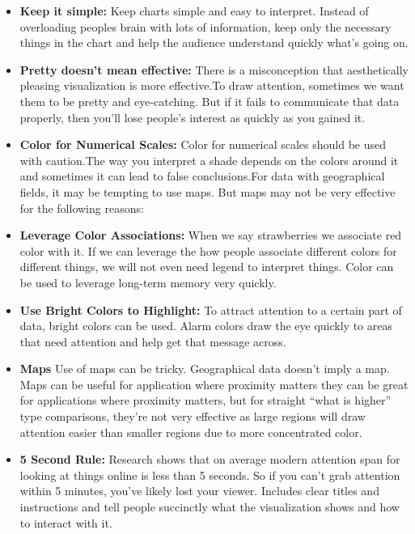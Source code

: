 \documentclass[]{book}
\providecommand{\tightlist}{%
  \setlength{\itemsep}{0pt}\setlength{\parskip}{0pt}}
\theoremstyle{definition}
\theoremstyle{definition}
\theoremstyle{definition}
\theoremstyle{remark}
\begin{document}
\begin{itemize}
\tightlist
\item
  \textbf{Keep it simple:} Keep charts simple and easy to interpret.
  Instead of overloading peoples brain with lots of information, keep
  only the necessary things in the chart and help the audience
  understand quickly what's going on.
\item
  \textbf{Pretty doesn't mean effective:} There is a misconception that
  aesthetically pleasing visualization is more effective.To draw
  attention, sometimes we want them to be pretty and eye-catching. But
  if it fails to communicate that data properly, then you'll lose
  people's interest as quickly as you gained it.
\item
  \textbf{Color for Numerical Scales:} Color for numerical scales should
  be used with caution.The way you interpret a shade depends on the
  colors around it and sometimes it can lead to false conclusions.For
  data with geographical fields, it may be tempting to use maps. But
  maps may not be very effective for the following reasons:
\item
  \textbf{Leverage Color Associations:} When we say strawberries we
  associate red color with it. If we can leverage the how people
  associate different colors for different things, we will not even need
  legend to interpret things. Color can be used to leverage long-term
  memory very quickly.
\item
  \textbf{Use Bright Colors to Highlight:} To attract attention to a
  certain part of data, bright colors can be used. Alarm colors draw the
  eye quickly to areas that need attention and help get that message
  across.
\item
  \textbf{Maps} Use of maps can be tricky. Geographical data doesn't
  imply a map. Maps can be useful for application where proximity
  matters they can be great for applications where proximity matters,
  but for straight ``what is higher'' type comparisons, they're not very
  effective as large regions will draw attention easier than smaller
  regions due to more concentrated color.
\item
  \textbf{5 Second Rule:} Research shows that on average modern
  attention span for looking at things online is less than 5 seconds. So
  if you can't grab attention within 5 minutes, you've likely lost your
  viewer. Includes clear titles and instructions and tell people
  succinctly what the visualization shows and how to interact with it.
\end{itemize}
\end{document}

